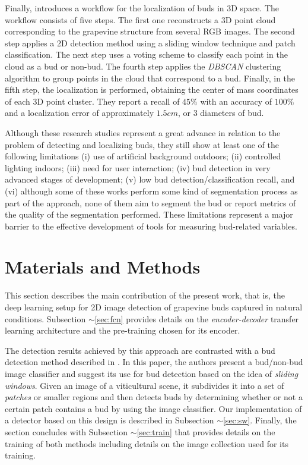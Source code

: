 \documentclass[a4paper,authoryear,review]{elsarticle}
\begin{document}
	Finally, \citet{diaz2018grapevine} introduces a workflow for the localization of buds in 3D space. The workflow consists of five steps. The first one reconstructs a 3D point cloud corresponding to the grapevine structure from several RGB images. The second step applies a 2D detection method using a sliding window technique and patch classification. The next step uses a voting scheme to classify each point in the cloud as a bud or non-bud. The fourth step applies the \emph{DBSCAN} clustering algorithm to group points in the cloud that correspond to a bud. Finally, in the fifth step, the localization is performed, obtaining the center of mass coordinates of each 3D point cluster. They report a recall of $45\%$ with an accuracy of $100\%$ and a localization error of approximately $1.5cm$, or 3 diameters of bud.  
	
	Although these research studies represent a great advance in relation to the problem of detecting and localizing buds, they still show at least one of the following limitations (i) use of artificial background outdoors; (ii) controlled lighting indoors; (iii) need for user interaction; (iv) bud detection in very advanced stages of development; (v) low bud detection/classification recall, and (vi) although some of these works perform some kind of segmentation process as part of the approach, none of them aim to segment the bud or report metrics of the quality of the segmentation performed. These limitations represent a major barrier to the effective development of tools for measuring bud-related variables. 
	
	\section{Materials and Methods}
	\label{sec:matmet}
	
	This section describes the main contribution of the present work, that is, the deep learning setup for 2D image detection of grapevine buds captured in natural conditions. Subsection $\sim$\ref{sec:fcn} provides details on the \emph{encoder-decoder} transfer learning architecture and the pre-training chosen for its encoder. 
	
	The detection results achieved by this approach are contrasted with a bud detection method described in  \citet{perez2017image}. In this paper, the authors present a bud/non-bud image classifier and suggest its use for bud detection based on the idea of \emph{sliding windows}. Given an image of a viticultural scene, it subdivides it into a set of \emph{patches} or smaller regions \citep{perez2017image} and then detects buds by determining whether or not a certain patch contains a bud by using the image classifier. Our implementation of a detector based on this design is described in Subsection $\sim$\ref{sec:sw}. Finally, the section concludes with Subsection $\sim$\ref{sec:train} that provides details on the training of both methods including details on the  image collection used for its training. 
	
\end{document}
